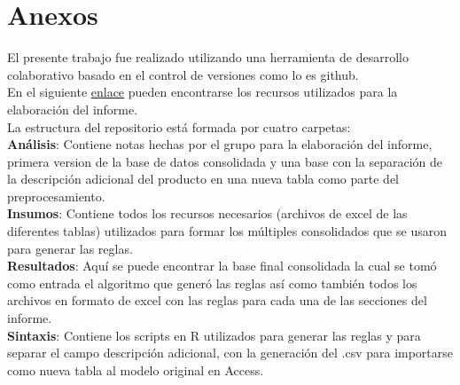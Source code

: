 \documentclass[]{article}
\begin{document}
	\section{Anexos}
	
	El presente trabajo fue realizado utilizando una herramienta de desarrollo colaborativo basado en el control de versiones como lo es github.\\
	
	\noindent En el siguiente \href{https://github.com/jairoji/DM_TP1/tree/master/TP1}{enlace} pueden encontrarse los recursos utilizados para la elaboración del informe.\\
	 
	
	\noindent La estructura del repositorio está formada por cuatro carpetas:\\
	
	\textbf{Análisis}: Contiene notas hechas por el grupo para la elaboración del informe, primera version de la base de datos consolidada y una base con la separación de la descripción adicional del producto en una nueva tabla como parte del preprocesamiento.\\
	
	\textbf{Insumos}: Contiene todos los recursos necesarios (archivos de excel de las diferentes tablas) utilizados para formar los múltiples consolidados que se usaron para generar las reglas.\\
	
	\textbf{Resultados}: Aquí se puede encontrar la base final consolidada la cual se tomó como entrada el algoritmo que generó las reglas así como también todos los  archivos en formato de excel con las reglas para cada una de las secciones del informe.\\
	
	\textbf{Sintaxis}: Contiene los scripts en R utilizados para generar las reglas y para separar el campo descripción adicional, con la generación del .csv para importarse como nueva tabla al modelo original en Access.\\
	
	
	
	
	
\end{document}
